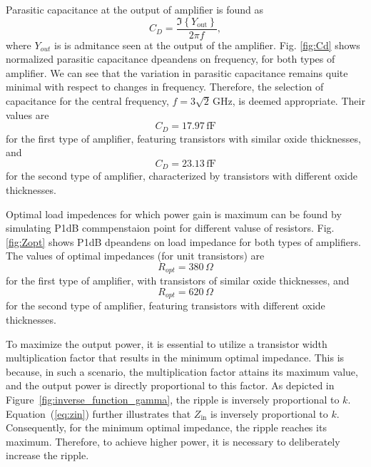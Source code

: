 \documentclass[lettersize,journal]{IEEEtran}
\begin{document}
Parasitic capacitance at the output of amplifier is found as
%
\begin{equation}
	\label{eq:cd}
	C_D = \frac{\Im \left\{ Y_{\text{out}} \right\}}{2 \pi f}, 
\end{equation}
%
where $Y_{out}$ is is admitance seen at the output of the amplifier. Fig. \ref{fig:Cd} shows normalized parasitic capacitance dpeandens on frequency, for both types of amplifier. We can see that the variation in parasitic capacitance remains quite minimal with respect to changes in frequency. Therefore, the selection of capacitance for the central frequency, $f = 3 \sqrt{2} \, \text{GHz}$, is deemed appropriate. Their values are
%
\begin{equation}
	\label{eq:cd_1}
	C_D = 17.97 \, \text{fF}
\end{equation}
%
for the first type of amplifier, featuring transistors with similar
oxide thicknesses, and
%
\begin{equation}
	\label{eq:cd_2}
	C_D = 23.13 \, \text{fF}
\end{equation}
%
for the second type of amplifier, characterized by transistors with different oxide thicknesses.


Optimal load impedences for which power gain is maximum can be found by simulating P1dB commpenstaion point for different valuse of resistors. Fig. \ref{fig:Zopt} shows P1dB dpeandens on load impedance for both types of amplifiers. The values of optimal impedances (for unit transistors) are
%
\begin{equation}
	\label{eq:Ropt_1}
	R_{opt} = 380 \, \Omega
\end{equation}
%
for the first type of amplifier, with transistors of similar oxide thicknesses, and
%
\begin{equation}
	\label{eq:Ropt_1}
	R_{opt} = 620 \, \Omega
\end{equation}
%
for the second type of amplifier, featuring transistors with different oxide thicknesses.



To maximize the output power, it is essential to utilize a transistor width multiplication factor that results in the minimum optimal impedance. This is because, in such a scenario, the multiplication factor attains its maximum value, and the output power is directly proportional to this factor. As depicted in Figure~\ref{fig:inverse_function_gamma}, the ripple is inversely proportional to $k$. Equation~(\ref{eq:zin}) further illustrates that $Z_{\text{in}}$ is inversely proportional to $k$. Consequently, for the minimum optimal impedance, the ripple reaches its maximum. Therefore, to achieve higher power, it is necessary to deliberately increase the ripple.
\end{document}
